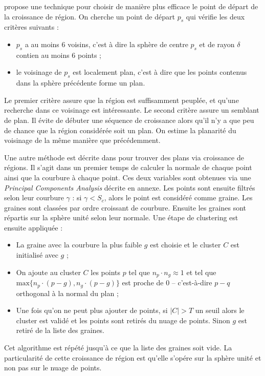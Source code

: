 \documentclass[12pt, twoside]{article}
\begin{document}
\cite{reggrow2} propose une technique pour choisir de manière plus efficace le point de départ de la croissance de région. On cherche un point de départ $p_s$ qui vérifie les deux critères suivants :
\begin{itemize}
  \item $p_s$ a au moins 6 voisins, c'est à dire la sphère de centre $p_s$ et de rayon $\delta$ contien au moins 6 points ;
  \item le voisinage de $p_s$ est localement plan, c'est à dire que les points contenus dans la sphère précédente forme un plan.
\end{itemize}
Le premier critère assure que la région est suffisamment peuplée, et qu’une recherche dans ce voisinage est intéressante. Le second critère assure un semblant de plan. Il évite de débuter une séquence de croissance alors qu’il n’y a que peu de chance que la région considérée soit un plan. On estime la planarité du voisinage de la même manière que précédemment.

Une autre méthode est décrite dans \cite{reggrow3} pour trouver des plans via croissance de régions. Il s'agit dans un premier temps de calculer la normale de chaque point ainsi que la courbure à chaque point. Ces deux variables sont obtenues via une \textit{Principal Components Analysis} décrite en annexe. Les points sont ensuite filtrés selon leur courbure $\gamma$ : si $\gamma < S_c$, alors le point est considéré comme graine. Les graines sont classées par ordre croissant de courbure. Ensuite les graines sont répartis sur la sphère unité selon leur normale. Une étape de clustering est ensuite appliquée :
\begin{itemize}
  \item La graine avec la courbure la plus faible $g$ est choisie et le cluster $C$ est initialisé avec $g$ ;
  \item On ajoute au cluster $C$ les points $p$ tel que $n_p\cdot n_g \approx 1$ et tel que $\text{max}\{n_p\cdot(p-g), n_g\cdot(p-g)\}$ est proche de 0 -- c'est-à-dire $p-q$ orthogonal à la normal du plan ;
  \item Une fois qu'on ne peut plus ajouter de points, si $\vert C\vert > T$ un seuil alors le cluster est validé et les points sont retirés du nuage de points. Sinon $g$ est retiré de la liste des graines.
\end{itemize}
Cet algorithme est répété jusqu'à ce que la liste des graines soit vide. La particularité de cette croissance de région est qu'elle s'opére sur la sphère unité et non pas sur le nuage de points.
\end{document}
